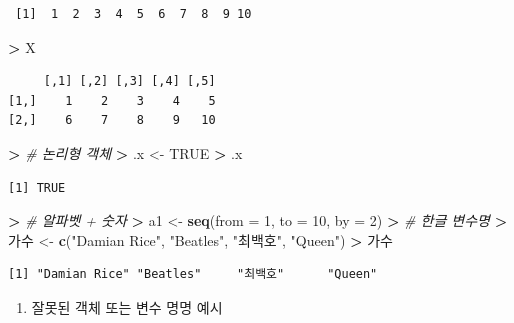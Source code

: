 \documentclass[12pt,a4paper]{book}
\newenvironment{Shaded}{\begin{snugshade}}{\end{snugshade}}
\newcommand{\KeywordTok}[1]{\textcolor[rgb]{0.13,0.29,0.53}{\textbf{#1}}}
\newcommand{\DataTypeTok}[1]{\textcolor[rgb]{0.13,0.29,0.53}{#1}}
\newcommand{\DecValTok}[1]{\textcolor[rgb]{0.00,0.00,0.81}{#1}}
\newcommand{\StringTok}[1]{\textcolor[rgb]{0.31,0.60,0.02}{#1}}
\newcommand{\CommentTok}[1]{\textcolor[rgb]{0.56,0.35,0.01}{\textit{#1}}}
\newcommand{\OtherTok}[1]{\textcolor[rgb]{0.56,0.35,0.01}{#1}}
\newcommand{\OperatorTok}[1]{\textcolor[rgb]{0.81,0.36,0.00}{\textbf{#1}}}
\newcommand{\ErrorTok}[1]{\textcolor[rgb]{0.64,0.00,0.00}{\textbf{#1}}}
\newcommand{\NormalTok}[1]{#1}
\providecommand{\tightlist}{%
  \setlength{\itemsep}{0pt}\setlength{\parskip}{0pt}}
\theoremstyle{definition}
\theoremstyle{definition}
\theoremstyle{definition}
\theoremstyle{remark}
\begin{document}
\begin{verbatim}
 [1]  1  2  3  4  5  6  7  8  9 10
\end{verbatim}

\begin{Shaded}
\begin{Highlighting}[]
\OperatorTok{>}\StringTok{ }\NormalTok{X}
\end{Highlighting}
\end{Shaded}

\begin{verbatim}
     [,1] [,2] [,3] [,4] [,5]
[1,]    1    2    3    4    5
[2,]    6    7    8    9   10
\end{verbatim}

\begin{Shaded}
\begin{Highlighting}[]
\OperatorTok{>}\StringTok{ }\CommentTok{# 논리형 객체}
\ErrorTok{>}\StringTok{ }\NormalTok{.x <-}\StringTok{ }\OtherTok{TRUE}
\OperatorTok{>}\StringTok{ }\NormalTok{.x}
\end{Highlighting}
\end{Shaded}

\begin{verbatim}
[1] TRUE
\end{verbatim}

\begin{Shaded}
\begin{Highlighting}[]
\OperatorTok{>}\StringTok{ }\CommentTok{# 알파벳 + 숫자}
\ErrorTok{>}\StringTok{ }\NormalTok{a1 <-}\StringTok{ }\KeywordTok{seq}\NormalTok{(}\DataTypeTok{from =} \DecValTok{1}\NormalTok{, }\DataTypeTok{to =} \DecValTok{10}\NormalTok{, }\DataTypeTok{by =} \DecValTok{2}\NormalTok{)}
\OperatorTok{>}\StringTok{ }\CommentTok{# 한글 변수명}
\ErrorTok{>}\StringTok{ }\NormalTok{가수 <-}\StringTok{ }\KeywordTok{c}\NormalTok{(}\StringTok{"Damian Rice"}\NormalTok{, }\StringTok{"Beatles"}\NormalTok{, }\StringTok{"최백호"}\NormalTok{, }\StringTok{"Queen"}\NormalTok{)}
\OperatorTok{>}\StringTok{ }\NormalTok{가수}
\end{Highlighting}
\end{Shaded}

\begin{verbatim}
[1] "Damian Rice" "Beatles"     "최백호"      "Queen"      
\end{verbatim}

\begin{enumerate}
\def\labelenumi{\arabic{enumi}.}
\setcounter{enumi}{2}
\tightlist
\item
  잘못된 객체 또는 변수 명명 예시
\end{enumerate}
\end{document}
